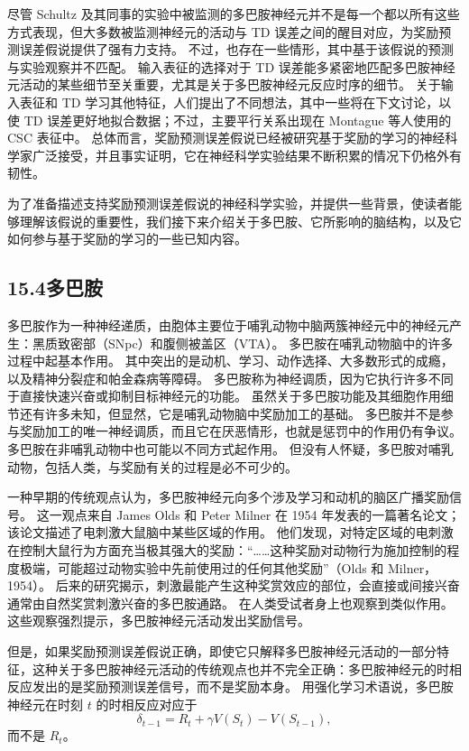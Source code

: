 \documentclass[UTF8, 12pt, fontset=fandol, oneside]{ctexart}
\begin{document}
尽管 Schultz 及其同事的实验中被监测的多巴胺神经元并不是每一个都以所有这些方式表现，但大多数被监测神经元的活动与 TD 误差之间的醒目对应，为奖励预测误差假说提供了强有力支持。
不过，也存在一些情形，其中基于该假说的预测与实验观察并不匹配。
输入表征的选择对于 TD 误差能多紧密地匹配多巴胺神经元活动的某些细节至关重要，尤其是关于多巴胺神经元反应时序的细节。
关于输入表征和 TD 学习其他特征，人们提出了不同想法，其中一些将在下文讨论，以使 TD 误差更好地拟合数据；不过，主要平行关系出现在 Montague 等人使用的 CSC 表征中。
总体而言，奖励预测误差假说已经被研究基于奖励的学习的神经科学家广泛接受，并且事实证明，它在神经科学实验结果不断积累的情况下仍格外有韧性。

为了准备描述支持奖励预测误差假说的神经科学实验，并提供一些背景，使读者能够理解该假说的重要性，我们接下来介绍关于多巴胺、它所影响的脑结构，以及它如何参与基于奖励的学习的一些已知内容。

\subsection*{15.4\quad 多巴胺}

多巴胺作为一种神经递质，由胞体主要位于哺乳动物中脑两簇神经元中的神经元产生：黑质致密部（SNpc）和腹侧被盖区（VTA）。
多巴胺在哺乳动物脑中的许多过程中起基本作用。
其中突出的是动机、学习、动作选择、大多数形式的成瘾，以及精神分裂症和帕金森病等障碍。
多巴胺称为神经调质，因为它执行许多不同于直接快速兴奋或抑制目标神经元的功能。
虽然关于多巴胺功能及其细胞作用细节还有许多未知，但显然，它是哺乳动物脑中奖励加工的基础。
多巴胺并不是参与奖励加工的唯一神经调质，而且它在厌恶情形，也就是惩罚中的作用仍有争议。
多巴胺在非哺乳动物中也可能以不同方式起作用。
但没有人怀疑，多巴胺对哺乳动物，包括人类，与奖励有关的过程是必不可少的。

一种早期的传统观点认为，多巴胺神经元向多个涉及学习和动机的脑区广播奖励信号。
这一观点来自 James Olds 和 Peter Milner 在 1954 年发表的一篇著名论文；该论文描述了电刺激大鼠脑中某些区域的作用。
他们发现，对特定区域的电刺激在控制大鼠行为方面充当极其强大的奖励：“……这种奖励对动物行为施加控制的程度极端，可能超过动物实验中先前使用过的任何其他奖励”（Olds 和 Milner，1954）。
后来的研究揭示，刺激最能产生这种奖赏效应的部位，会直接或间接兴奋通常由自然奖赏刺激兴奋的多巴胺通路。
在人类受试者身上也观察到类似作用。
这些观察强烈提示，多巴胺神经元活动发出奖励信号。

但是，如果奖励预测误差假说正确，即使它只解释多巴胺神经元活动的一部分特征，这种关于多巴胺神经元活动的传统观点也并不完全正确：多巴胺神经元的时相反应发出的是奖励预测误差信号，而不是奖励本身。
用强化学习术语说，多巴胺神经元在时刻 $t$ 的时相反应对应于
\[
\delta_{t-1}=R_t+\gamma V(S_t)-V(S_{t-1}),
\]
而不是 $R_t$。
\end{document}
